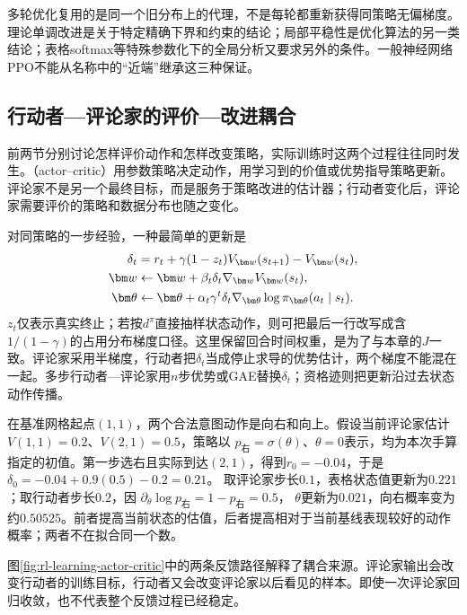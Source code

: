 多轮优化复用的是同一个旧分布上的代理，不是每轮都重新获得同策略无偏梯度。理论单调改进是关于特定精确下界和约束的结论；局部平稳性是优化算法的另一类结论；表格softmax等特殊参数化下的全局分析又要求另外的条件。一般神经网络PPO不能从名称中的“近端”继承这三种保证。

\subsection{行动者—评论家的评价—改进耦合}
\label{sec:rl-learning-actor-critic}

前两节分别讨论怎样评价动作和怎样改变策略，实际训练时这两个过程往往同时发生。（actor--critic）用参数策略决定动作，用学习到的价值或优势指导策略更新。评论家不是另一个最终目标，而是服务于策略改进的估计器；行动者变化后，评论家需要评价的策略和数据分布也随之变化。

对同策略的一步经验，一种最简单的更新是
\begin{align}
  \delta_t&=r_t+\gamma(1-z_t)V_{\bm w}(s_{t+1})-V_{\bm w}(s_t),
       \notag\\
  \bm w&\gets\bm w+\beta_t\delta_t\nabla_{\bm w}V_{\bm w}(s_t),
       \notag\\
  \bm\theta&\gets\bm\theta+
       \alpha_t\gamma^t\delta_t
          \nabla_{\bm\theta}\log\pi_{\bm\theta}(a_t\mid s_t).
  \label{eq:rl-learning-one-step-ac}
\end{align}
$z_t$仅表示真实终止；若按$d^\pi$直接抽样状态动作，则可把最后一行改写成含$1/(1-\gamma)$的占用分布梯度口径。这里保留回合时间权重，是为了与本章的$J$一致。评论家采用半梯度，行动者把$\delta_t$当成停止求导的优势估计，两个梯度不能混在一起。多步行动者—评论家用$n$步优势或GAE替换$\delta_t$；资格迹则把更新沿过去状态动作传播。

\begin{example}[同一经验的两种更新]
  \label{ex:rl-learning-actor-critic}
  在基准网格起点$(1,1)$，两个合法意图动作是向右和向上。假设当前评论家估计
  $V(1,1)=0.2$、$V(2,1)=0.5$，策略以
  $p_{\text{右}}=\sigma(\theta)$、$\theta=0$表示，均为本次手算指定的初值。第一步选右且实际到达$(2,1)$，得到$r_0=-0.04$，于是
  $\delta_0=-0.04+0.9(0.5)-0.2=0.21$。
  取评论家步长$0.1$，表格状态值更新为$0.221$；取行动者步长$0.2$，因
  $\partial_\theta\log p_{\text{右}}=1-p_{\text{右}}=0.5$，
  $\theta$更新为$0.021$，向右概率变为约$0.50525$。前者提高当前状态的估值，后者提高相对于当前基线表现较好的动作概率；两者不在拟合同一个数。
\end{example}

图\ref{fig:rl-learning-actor-critic}中的两条反馈路径解释了耦合来源。评论家输出会改变行动者的训练目标，行动者又会改变评论家以后看见的样本。即使一次评论家回归收敛，也不代表整个反馈过程已经稳定。


